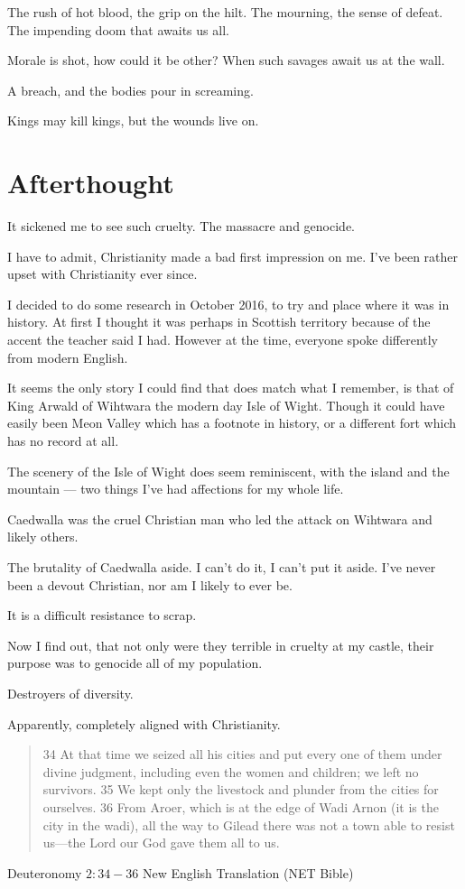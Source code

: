 The rush of hot blood, the grip on the hilt. The mourning, the sense of defeat. 
The impending doom that awaits us all. 

Morale is shot, how could it be other? When such savages await us at the wall.

A breach, and the bodies pour in screaming. 

Kings may kill kings, but the wounds live on. 
\section{Afterthought}

It sickened me to see such cruelty. The massacre and genocide. 

I have to admit, Christianity made a bad first impression on me. 
I've been rather upset with Christianity ever since. 

I decided to do some research in October 2016, to try and place where it was in
history. At first I thought it was perhaps in Scottish territory because of the
accent the teacher said I had. However at the time, everyone spoke differently
from modern English. 

It seems the only story I could find that does match what I remember, is that of
King Arwald of Wihtwara the modern day Isle of Wight.  
Though it could have easily been Meon Valley which has a footnote in history, 
or a different fort which has no record at all. 

The scenery of the Isle of Wight does seem reminiscent, with the island and the
mountain --- two things I've had affections for my whole life. 

Caedwalla was the cruel Christian man who led the attack on Wihtwara and likely
others.

The brutality of Caedwalla aside. I can't do it, I can't put it aside. 
I've never been a devout Christian, nor am I likely to ever be. 

It is a difficult resistance to scrap. 

Now I find out, that not only were they terrible in cruelty at my castle,
their purpose was to genocide all of my population.

Destroyers of diversity. 

Apparently, completely aligned with Christianity. 

\blockquote{34 At that time we seized all his cities and put every one of them 
under divine judgment, including even the women and children; we left no 
survivors. 35 We kept only the livestock and plunder from the cities for 
ourselves. 36 From Aroer, which is at the edge of Wadi Arnon (it is the city in
 the wadi), all the way to Gilead there was not a town able to resist us—the 
Lord our God gave them all to us.}{Deuteronomy $2:34-36$ New English Translation
(NET Bible)}
 
